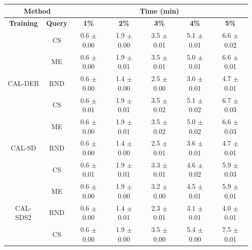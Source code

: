 \begin{table}[htbp]
\centering

\begin{tabular*}{\linewidth}{c|c|@{\extracolsep{\fill}}ccccc}
\toprule
\multicolumn{2}{c|}{\textbf{Method}} & \multicolumn{5}{c}{\textbf{Time (min)}} \\
\midrule
\textbf{Training} & \textbf{Query} & \textbf{1\%} & \textbf{2\%} & \textbf{3\%} & \textbf{4\%} & \textbf{5\%}\\
\midrule
 & CS & 0.6 $\pm$ {\small 0.00} & 1.9 $\pm$ {\small 0.00} & 3.5 $\pm$ {\small 0.01} & 5.1 $\pm$ {\small 0.01} & 6.6 $\pm$ {\small 0.02}\\

 & ME & 0.6 $\pm$ {\small 0.00} & 1.9 $\pm$ {\small 0.01} & 3.5 $\pm$ {\small 0.01} & 5.0 $\pm$ {\small 0.01} & 6.6 $\pm$ {\small 0.01}\\

\multirow{-3}{*}{\raggedright\arraybackslash CAL-DER} & RND & 0.6 $\pm$ {\small 0.00} & 1.4 $\pm$ {\small 0.00} & 2.5 $\pm$ {\small 0.00} & 3.6 $\pm$ {\small 0.01} & 4.7 $\pm$ {\small 0.01}\\
\midrule
 & CS & 0.6 $\pm$ {\small 0.01} & 1.9 $\pm$ {\small 0.01} & 3.5 $\pm$ {\small 0.02} & 5.1 $\pm$ {\small 0.02} & 6.7 $\pm$ {\small 0.03}\\

 & ME & 0.6 $\pm$ {\small 0.00} & 1.9 $\pm$ {\small 0.01} & 3.5 $\pm$ {\small 0.02} & 5.0 $\pm$ {\small 0.02} & 6.6 $\pm$ {\small 0.03}\\

\multirow{-3}{*}{\raggedright\arraybackslash CAL-SD} & RND & 0.6 $\pm$ {\small 0.00} & 1.4 $\pm$ {\small 0.00} & 2.5 $\pm$ {\small 0.01} & 3.6 $\pm$ {\small 0.01} & 4.7 $\pm$ {\small 0.01}\\
\midrule
 & CS & 0.6 $\pm$ {\small 0.01} & 1.9 $\pm$ {\small 0.01} & 3.3 $\pm$ {\small 0.01} & 4.6 $\pm$ {\small 0.02} & 5.9 $\pm$ {\small 0.03}\\

 & ME & 0.6 $\pm$ {\small 0.00} & 1.9 $\pm$ {\small 0.00} & 3.2 $\pm$ {\small 0.00} & 4.5 $\pm$ {\small 0.01} & 5.9 $\pm$ {\small 0.01}\\

\multirow{-3}{*}{\raggedright\arraybackslash CAL-SDS2} & RND & 0.6 $\pm$ {\small 0.00} & 1.4 $\pm$ {\small 0.01} & 2.3 $\pm$ {\small 0.01} & 3.1 $\pm$ {\small 0.01} & 4.0 $\pm$ {\small 0.01}\\
\midrule
 & CS & 0.6 $\pm$ {\small 0.00} & 1.9 $\pm$ {\small 0.00} & 3.5 $\pm$ {\small 0.00} & 5.4 $\pm$ {\small 0.00} & 7.5 $\pm$ {\small 0.01}\\


\end{tabular*}
\end{table}

